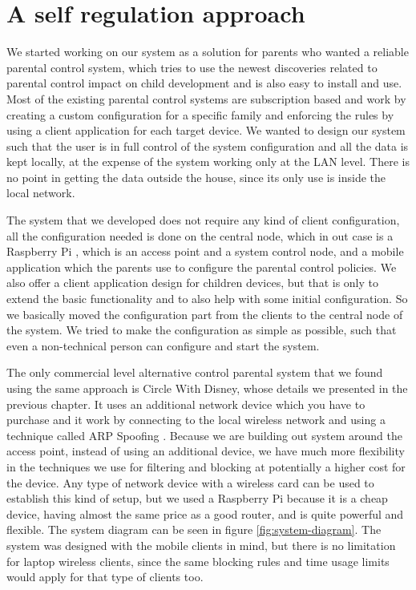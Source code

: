 
\chapter{A self regulation approach} %

\label{Chapter3} %

We started working on our system as a solution for parents who wanted a reliable parental control system, which tries to use the newest discoveries related to parental control impact on child development and is also easy to install and use. Most of the existing parental control systems are subscription based and work by creating a custom configuration for a specific family and enforcing the rules by using a client application for each target device. We wanted to design our system such that the user is in full control of the system configuration and all the data is kept locally, at the expense of the system working only at the LAN level. There is no point in getting the data outside the house, since its only use is inside the local network. 

The system that we developed does not require any kind of client configuration, all the configuration needed is done on the central node, which in out case is a Raspberry Pi \citep{raspberryPi}, which is an access point and a system control node, and a mobile application which the parents use to configure the parental control policies. We also offer a client application design for children devices, but that is only to extend the basic functionality and to also help with some initial configuration. So we basically moved the configuration part from the clients to the central node of the system. We tried to make the configuration as simple as possible, such that even a non-technical person can configure and start the system. 

The only commercial level alternative control parental system that we found using the same approach is Circle With Disney, whose details we presented in the previous chapter. It uses an additional network device which you have to purchase and it work by connecting to the local wireless network and using a technique called ARP Spoofing \citep{lockhart2004network}. Because we are building out system around the access point, instead of using an additional device, we have much more flexibility in the techniques we use for filtering and blocking at potentially a higher cost for the device. Any type of network device with a wireless card can be used to establish this kind of setup, but we used a Raspberry Pi because it is a cheap device, having almost the same price as a good router, and is quite powerful and flexible. The system diagram can be seen in figure \ref{fig:system-diagram}. The system was designed with the mobile clients in mind, but there is no limitation for laptop wireless clients, since the same blocking rules and time usage limits would apply for that type of clients too.

